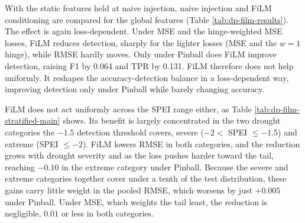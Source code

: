 \documentclass[
]{krantz}
\begin{document}
With the static features held at naive injection, naive injection and FiLM conditioning are compared for the global features (Table \ref{tab:dp-film-results}).
The effect is again loss-dependent.
Under MSE and the hinge-weighted MSE losses, FiLM reduces detection, sharply for the lighter losses (MSE and the \(w=1\) hinge), while RMSE hardly moves.
Only under Pinball does FiLM improve detection, raising F1 by 0.064 and TPR by 0.131.
FiLM therefore does not help uniformly. It reshapes the accuracy-detection balance in a loss-dependent way, improving detection only under Pinball while barely changing accuracy.

\begin{table}[!h]
\centering
\caption{\label{tab:dp-film-results}Global-feature injection performance on the test set. $\Delta$ is FiLM minus naive.}
\centering
{}
\end{table}

FiLM does not act uniformly across the SPEI range either, as Table \ref{tab:dp-film-stratified-main} shows.
Its benefit is largely concentrated in the two drought categories the \(-1.5\) detection threshold covers, severe (\(-2 <\) SPEI \(\le -1.5\)) and extreme (SPEI \(\le -2\)).
FiLM lowers RMSE in both categories, and the reduction grows with drought severity and as the loss pushes harder toward the tail, reaching \(-0.10\) in the extreme category under Pinball.
Because the severe and extreme categories together cover under a tenth of the test distribution, these gains carry little weight in the pooled RMSE, which worsens by just \(+0.005\) under Pinball.
Under MSE, which weights the tail least, the reduction is negligible, \(0.01\) or less in both categories.
\end{document}
